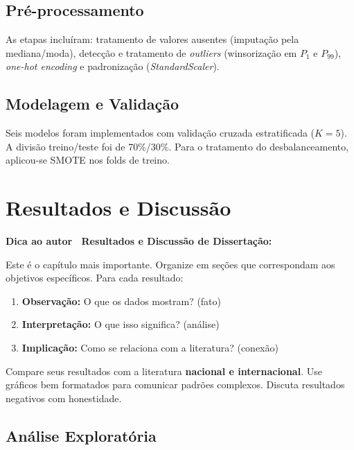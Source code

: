 \documentclass[
    12pt,
    oneside,
    a4paper,
    english,
    brazilian
    ]{abntex2}
\numberwithin{equation}{chapter}
\newenvironment{dica}{%
    \par\medskip
    \color{blue!60!black}\small\itshape
}{%
    \par\medskip
}
\begin{document}


\section{Pré-processamento}

As etapas incluíram: tratamento de valores ausentes (imputação pela mediana/moda), detecção e tratamento de \textit{outliers} (winsorização em $P_1$ e $P_{99}$), \textit{one-hot encoding} e padronização (\textit{StandardScaler}).

\section{Modelagem e Validação}

Seis modelos foram implementados com validação cruzada estratificada ($K = 5$). A divisão treino/teste foi de 70\%/30\%. Para o tratamento do desbalanceamento, aplicou-se SMOTE nos folds de treino.

\chapter{Resultados e Discussão}

\begin{dica}
\noindent\textbf{Dica ao autor \textemdash\ Resultados e Discussão de Dissertação:}

Este é o capítulo mais importante. Organize em seções que correspondam aos objetivos específicos. Para cada resultado:
\begin{enumerate}
    \item \textbf{Observação:} O que os dados mostram? (fato)
    \item \textbf{Interpretação:} O que isso significa? (análise)
    \item \textbf{Implicação:} Como se relaciona com a literatura? (conexão)
\end{enumerate}
Compare seus resultados com a literatura \textbf{nacional e internacional}. Use gráficos bem formatados para comunicar padrões complexos. Discuta resultados negativos com honestidade.
\end{dica}

\section{Análise Exploratória}
\end{document}
